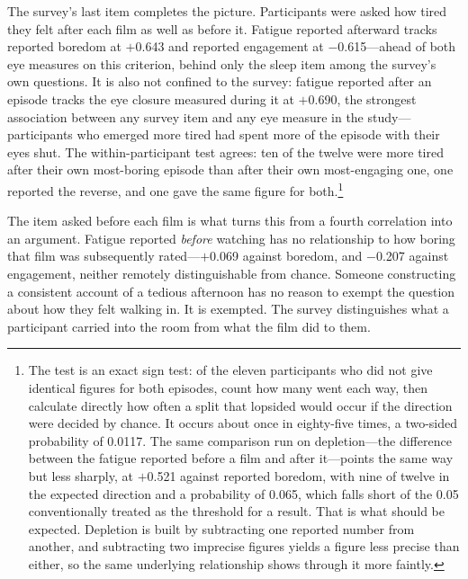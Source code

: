 The survey's last item completes the picture. Participants were asked how tired they felt after
each film as well as before it. Fatigue reported afterward tracks reported boredom at $+$0.643
and reported engagement at $-$0.615---ahead of both eye measures on this criterion, behind only
the sleep item among the survey's own questions. It is also not confined to the survey: fatigue
reported after an episode tracks the eye closure measured during it at $+$0.690, the strongest
association between any survey item and any eye measure in the study---participants who emerged
more tired had spent more of the episode with their eyes shut. The
within-participant test agrees: ten of the twelve were more tired after their own most-boring
episode than after their own most-engaging one, one reported the reverse, and one gave the same
figure for both.\footnote{The test is an exact sign test: of the eleven participants who did not give
identical figures for both episodes, count how many went each way, then calculate directly how
often a split that lopsided would occur if the direction were decided by chance. It occurs
about once in eighty-five times, a two-sided probability of 0.0117. The same comparison run on
depletion---the difference between the fatigue reported before a film and after it---points the
same way but less sharply, at $+$0.521 against reported boredom, with nine of twelve in the
expected direction and a probability of 0.065, which falls short of the 0.05 conventionally
treated as the threshold for a result. That is what should be expected. Depletion is built by
subtracting one reported number from another, and subtracting two imprecise figures yields a
figure less precise than either, so the same underlying relationship shows through it more
faintly.}

The item asked before each film is what turns this from a fourth correlation into an argument.
Fatigue reported \textit{before} watching has no relationship to how boring that film was
subsequently rated---$+$0.069 against boredom, and $-$0.207 against engagement, neither
remotely distinguishable from chance. Someone constructing a consistent account of a tedious
afternoon has no reason to exempt the question about how they felt walking in. It is exempted.
The survey distinguishes what a participant carried into the room from what the film did to
them.

